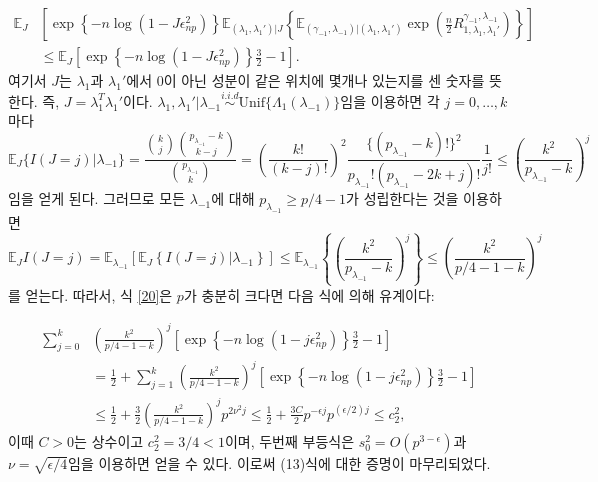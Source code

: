 \begin{equation}\label{20}\tag{20}
\begin{aligned}
\mathbb{E}_J &\left[\exp \left\{-n \log (1 -J\epsilon_{np}^2) \right\}\mathbb{E}_{(\lambda_1, \lambda_1')|J} \left\{ \mathbb{E}_{(\gamma_{-1}, \lambda_{-1})|(\lambda_1, \lambda_1')}\exp\left(\frac n2 R_{1,\lambda_1,\lambda_1'}^{\gamma_{-1}, \lambda_{-1}} \right)\right\} \right]\\
&\le \mathbb{E}_J\left[\exp\left\{ -n\log (1- J\epsilon_{np}^2)\right\}\frac32 -1 \right].
\end{aligned}
\end{equation}
여기서 $J$는 $\lambda_1$과 $\lambda_1'$에서 0이 아닌 성분이 같은 위치에 몇개나 있는지를 센 숫자를 뜻한다. 즉, $J = \lambda_1^T \lambda_1'$이다. $\lambda_1, \lambda_1' |\lambda_{-1} \overset{i.i.d}{\sim}\mbox{Unif}\{\Lambda_1(\lambda_{-1})\}$임을 이용하면 각 $j=0, \dots, k$마다
\[
\mathbb{E}_J \{ I(J=j) | \lambda_{-1} \} = \frac{\binom{k}{j} \binom{p_{\lambda_{-1}}-k }{k-j}}{\binom{p_{\lambda_{-1}}}{k}} = \left(\frac{k!}{(k-j)!}\right)^2 \frac{\{(p_{\lambda_{-1}}-k)! \}^2}{p_{\lambda_{-1}}! (p_{\lambda_{-1}} -2k +j)!} \frac{1}{j!} \le \left( \frac{k^2}{p_{\lambda_{-1}} -k}\right)^j
\]
임을 얻게 된다. 그러므로 모든 $\lambda_{-1}$에 대해 $p_{\lambda_{-1}} \ge p/4-1$가 성립한다는 것을 이용하면
\[
\mathbb{E}_J I (J=j) = \mathbb{E}_{\lambda_{-1}} \left[\mathbb{E}_J \left\{ I(J=j) | \lambda_{-1}\right\}\right] \le \mathbb{E}_{\lambda_{-1}}\left\{ \left( \frac{k^2}{p_{\lambda_{-1}} -k}\right)^j\right\} \le \left( \frac{k^2}{p/4-1-k}\right)^j
\]
를 얻는다. 따라서, 식 \eqref{20}은 $p$가 충분히 크다면 다음 식에 의해 유계이다:

\[\begin{aligned}
\sum_{j=0}^k &\left(\frac{k^2}{p/4-1-k} \right)^j \left[\exp\left\{ -n\log(1-j \epsilon_{np}^2)\right\}\frac 32 -1 \right]\\
&= \frac12 + \sum_{j=1}^k \left(\frac{k^2}{p/4-1-k} \right)^j \left[\exp\left\{ -n\log(1-j \epsilon_{np}^2)\right\}\frac 32 -1 \right]\\
&\le \frac12 + \frac32 \left(\frac{k^2}{p/4-1-k} \right)^j  p^{2\nu^2 j} \le  \frac12 + \frac{3C}{2} p^{-\epsilon j}p^{(\epsilon/2) j} \le c_2^2,
\end{aligned}\]
이때 $C>0$는 상수이고 $c_2^2 = 3/4 <1$이며, 두번째 부등식은 $s_0^2 = O(p^{3-\epsilon})$과 $\nu = \sqrt{\epsilon/4}$임을 이용하면 얻을 수 있다. 이로써 (13)식에 대한 증명이 마무리되었다.
